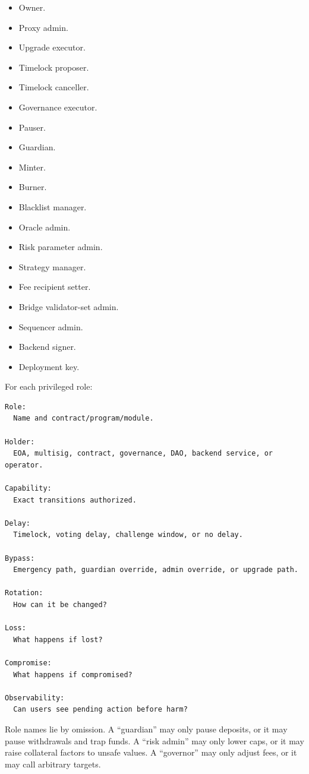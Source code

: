 \begin{itemize}
\tightlist
\item
  Owner.
\item
  Proxy admin.
\item
  Upgrade executor.
\item
  Timelock proposer.
\item
  Timelock canceller.
\item
  Governance executor.
\item
  Pauser.
\item
  Guardian.
\item
  Minter.
\item
  Burner.
\item
  Blacklist manager.
\item
  Oracle admin.
\item
  Risk parameter admin.
\item
  Strategy manager.
\item
  Fee recipient setter.
\item
  Bridge validator-set admin.
\item
  Sequencer admin.
\item
  Backend signer.
\item
  Deployment key.
\end{itemize}

For each privileged role:

\begin{lstlisting}
Role:
  Name and contract/program/module.

Holder:
  EOA, multisig, contract, governance, DAO, backend service, or operator.

Capability:
  Exact transitions authorized.

Delay:
  Timelock, voting delay, challenge window, or no delay.

Bypass:
  Emergency path, guardian override, admin override, or upgrade path.

Rotation:
  How can it be changed?

Loss:
  What happens if lost?

Compromise:
  What happens if compromised?

Observability:
  Can users see pending action before harm?
\end{lstlisting}

Role names lie by omission. A ``guardian'' may only pause deposits, or
it may pause withdrawals and trap funds. A ``risk admin'' may only lower
caps, or it may raise collateral factors to unsafe values. A
``governor'' may only adjust fees, or it may call arbitrary targets.

